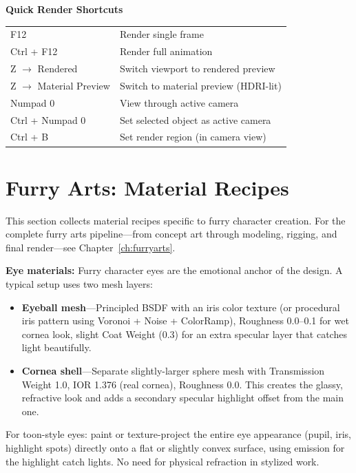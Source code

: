 \begin{shortcutbox}
\textbf{Quick Render Shortcuts}

\begin{center}
\begin{tabularx}{\textwidth}{L{4cm}X}
\toprule
{}
 &  \\
\midrule
F12 & Render single frame \\
Ctrl + F12 & Render full animation \\
Z $\rightarrow$ Rendered & Switch viewport to rendered preview \\
Z $\rightarrow$ Material Preview & Switch to material preview (HDRI-lit) \\
Numpad 0 & View through active camera \\
Ctrl + Numpad 0 & Set selected object as active camera \\
Ctrl + B & Set render region (in camera view) \\
\bottomrule
\end{tabularx}
\end{center}
\end{shortcutbox}


\section{Furry Arts: Material Recipes}
\label{sec:shading:furryrecipes}

This section collects material recipes specific to furry character
creation. For the complete furry arts pipeline---from concept art
through modeling, rigging, and final render---see
Chapter~\ref{ch:furryarts}.

\begin{furrybox}
\textbf{Eye materials:} Furry character eyes are the emotional
anchor of the design. A typical setup uses two mesh layers:
\begin{itemize}[leftmargin=1.5em]
  \item \textbf{Eyeball mesh}---Principled BSDF with an iris color
        texture (or procedural iris pattern using Voronoi + Noise
        + ColorRamp), Roughness 0.0--0.1 for wet cornea look,
        slight Coat Weight (0.3) for an extra specular layer that
        catches light beautifully.
  \item \textbf{Cornea shell}---Separate slightly-larger sphere
        mesh with Transmission Weight 1.0, IOR 1.376 (real cornea),
        Roughness 0.0. This creates the glassy, refractive look and
        adds a secondary specular highlight offset from the main one.
\end{itemize}
For toon-style eyes: paint or texture-project the entire eye
appearance (pupil, iris, highlight spots) directly onto a flat or
slightly convex surface, using emission for the highlight catch
lights. No need for physical refraction in stylized work.
\end{furrybox}

